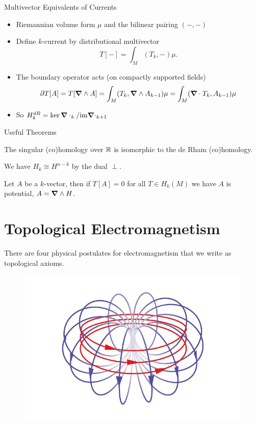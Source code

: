 \documentclass[aspectratio=169]{beamer}
\begin{document}
\begin{frame}{Multivector Equivalents of Currents}
\vfill
\begin{itemize}
	\item Riemannian volume form $\mu$ and the bilinear pairing  $(-,-)$
    \item Define $k$-current by distributional multivector
    \[
    T[-] = \int_M (T_k,-)\mu.
    \]
    \item The boundary operator acts (on compactly supported fields)
    \[
    \partial T[A] = T[\boldsymbol{\nabla} \wedge A] = \int_M(T_k,\boldsymbol{\nabla} \wedge A_{k-1})\mu = \int_M (\boldsymbol{\nabla} \cdot T_k,A_{k-1})\mu
    \]
    \item So $H_k^{dR} = \ker \boldsymbol{\nabla} \cdot_k / \mathrm{im} \boldsymbol{\nabla} \cdot_{k+1}$
    \end{itemize}
\vfill
\end{frame}

\begin{frame}{Useful Theorems}
\vfill

    \begin{theorem}
        The singular (co)homology over $\mathbb{R}$ is isomorphic to the de Rham (co)homology.
    \end{theorem}
    \begin{theorem}
        We have $H_k\cong H^{n-k}$ by the dual $\perp$. %
    \end{theorem}
    
    \begin{theorem}[Potentials]
    Let $A$ be a $k$-vector, then if $T[A]=0$ for all $T \in H_k(M)$ we have $A$ is potential,  $A=\boldsymbol{\nabla} \wedge H$.
    \end{theorem}

\vfill
\end{frame}

\section{Topological Electromagnetism}

\begin{frame}{}
\vfill
There are four physical postulates for electromagnetism that we write as topological axioms. 
\begin{figure}[H]
	\centering
	\includegraphics[width=.5\textwidth]{figures/top_em.png}
\end{figure}
\vfill
\end{frame}
\end{document}
